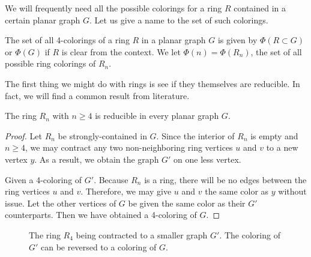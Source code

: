 We will frequently need all the possible colorings for a ring $R$ contained in a certain planar graph $G$. Let us give a name to the set of such colorings.

\begin{definition}
    The set of all 4-colorings of a ring $R$ in a planar graph $G$ is given by $\Phi(R \subset G)$ or $\Phi(G)$ if $R$ is clear from the context. We let $\Phi(n) = \Phi(R_n)$, the set of all possible ring colorings of $R_n$.
\end{definition}

The first thing we might do with rings is see if they themselves are reducible. In fact, we will find a common result from literature.

\begin{theorem}
    \label{thm:ringsarered}
    The ring $R_n$ with $n\geq 4$ is reducible in every planar graph $G$.
\end{theorem}

\begin{proof}
Let $R_n$ be strongly-contained in $G$. Since the interior of $R_n$ is empty and $n\geq4$, we may contract any two non-neighboring ring vertices $u$ and $v$ to a new vertex $y$. As a result, we obtain the graph $G'$ on one less vertex. 

Given a 4-coloring of $G'$. Because $R_n$ is a ring, there will be no edges between the ring vertices $u$ and $v$. Therefore, we may give $u$ and $v$ the same color as $y$ without issue. Let the other vertices of $G$ be given the same color as their $G'$ counterparts. Then we have obtained a 4-coloring of $G$.

\end{proof}

\begin{figure}[!ht]
    \centering
    \caption{The ring $R_4$ being contracted to a smaller graph $G'$. The coloring of $G'$ can be reversed to a coloring of $G$.}
\end{figure}

